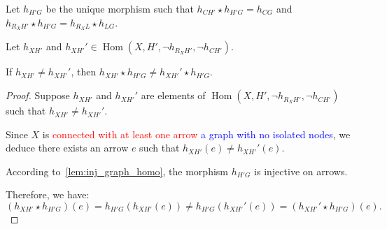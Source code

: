 \begin{lemma}
    \label{lem:1_dist}
    
            

    Let $h_{H'G}$ be the unique morphism such that $h_{CH'} \star h_{H'G} = h_{CG}$ and $h_{R_XH'} \star h_{H'G} = h_{R_XL} \star h_{LG}$.

    Let $h_{XH'}$ and $h_{XH'}' \in \operatorname{Hom}(X, H', \lnot h_{R_XH'}, \lnot h_{CH'})$. 
    
    If $h_{XH'} \neq h_{XH'}'$, then $h_{XH'} \star h_{H'G} \neq h_{XH'}' \star h_{H'G}$.
    
\end{lemma}

\begin{proof}
    Suppose $h_{XH'}$ and $h_{XH'}'$ are elements of $\operatorname{Hom}(X, H', \lnot h_{R_XH'}, \lnot h_{CH'})$ such that $h_{XH'} \neq h_{XH'}'$.

    Since $X$ is \textcolor{red}{connected with at least one arrow} \textcolor{blue}{a graph with no isolated nodes}, we deduce there exists an arrow $e$ such that $h_{XH'}(e) \neq h_{XH'}'(e)$.

    According to~\autoref{lem:inj_graph_homo}, the morphism $h_{H'G}$ is injective on arrows.
    
    Therefore, we have:
    \[
    (h_{XH'} \star h_{H'G})(e) = h_{H'G}(h_{XH'}(e)) \neq h_{H'G}(h_{XH'}'(e)) = (h_{XH'}' \star h_{H'G})(e).
    \]
\end{proof}


